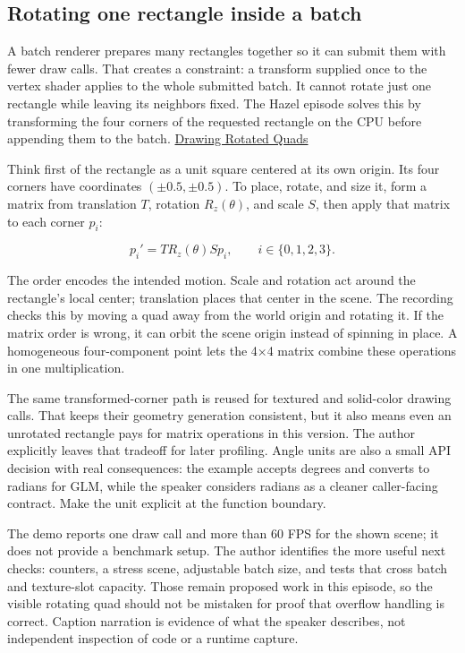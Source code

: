 \subsection{Rotating one rectangle inside a batch}\label{06-engine-ii-ch026-rotating-one-rectangle-inside-a-batch}

\hypertarget{06-engine-ii-ch026-rotating-one-rectangle-inside-a-batch}{}

A batch renderer prepares many rectangles together so it can submit them with fewer draw calls. That creates a constraint: a transform supplied once to the vertex shader applies to the whole submitted batch. It cannot rotate just one rectangle while leaving its neighbors fixed. The Hazel episode solves this by transforming the four corners of the requested rectangle on the CPU before appending them to the batch. \href{https://www.youtube.com/watch?v=-SQ8TlFZHbY}{Drawing Rotated Quads}

Think first of the rectangle as a unit square centered at its own origin. Its four corners have coordinates \((\pm 0.5, \pm 0.5)\). To place, rotate, and size it, form a matrix from translation \(T\), rotation \(R_z(\theta)\), and scale \(S\), then apply that matrix to each corner \(p_i\):

\[p_i' = T R_z(\theta) S p_i, \qquad i \in \{0,1,2,3\}.\]

The order encodes the intended motion. Scale and rotation act around the rectangle's local center; translation places that center in the scene. The recording checks this by moving a quad away from the world origin and rotating it. If the matrix order is wrong, it can orbit the scene origin instead of spinning in place. A homogeneous four-component point lets the 4×4 matrix combine these operations in one multiplication.

The same transformed-corner path is reused for textured and solid-color drawing calls. That keeps their geometry generation consistent, but it also means even an unrotated rectangle pays for matrix operations in this version. The author explicitly leaves that tradeoff for later profiling. Angle units are also a small API decision with real consequences: the example accepts degrees and converts to radians for GLM, while the speaker considers radians as a cleaner caller-facing contract. Make the unit explicit at the function boundary.

The demo reports one draw call and more than 60 FPS for the shown scene; it does not provide a benchmark setup. The author identifies the more useful next checks: counters, a stress scene, adjustable batch size, and tests that cross batch and texture-slot capacity. Those remain proposed work in this episode, so the visible rotating quad should not be mistaken for proof that overflow handling is correct. Caption narration is evidence of what the speaker describes, not independent inspection of code or a runtime capture.

